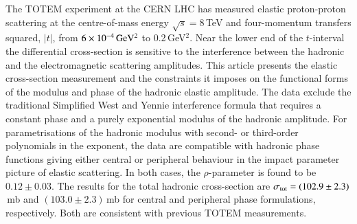 The TOTEM experiment at the CERN LHC has measured elastic proton-proton 
scattering at the centre-of-mass energy 
$\sqrt{s}=8\,$TeV and four-momentum transfers squared, $|t|$, from $6\times10^{-4}\,\rm GeV^{2}$ to 0.2\,GeV$^{2}$.
Near the lower end of the $t$-interval the differential cross-section is 
sensitive to the 
interference between the hadronic and the electromagnetic scattering amplitudes.
This article presents the elastic cross-section measurement and the constraints it 
imposes on the functional forms of the modulus and
phase of the hadronic elastic amplitude. The data exclude the traditional 
Simplified West and Yennie interference formula that requires a constant 
phase and a purely exponential modulus of the hadronic amplitude. 
For parametrisations of the hadronic modulus with second- or third-order 
polynomials in the exponent, the data are compatible with hadronic phase 
functions giving either central or peripheral behaviour in the impact 
parameter picture of elastic scattering. In both cases, 
the $\rho$-parameter is found to be $0.12 \pm 0.03$. 
The results for the total hadronic 
cross-section are $\sigma_{\rm tot} = (102.9 \pm 2.3)$\,mb and 
$(103.0 \pm 2.3)$\,mb for central and peripheral phase formulations, 
respectively. Both are consistent with previous TOTEM measurements.
